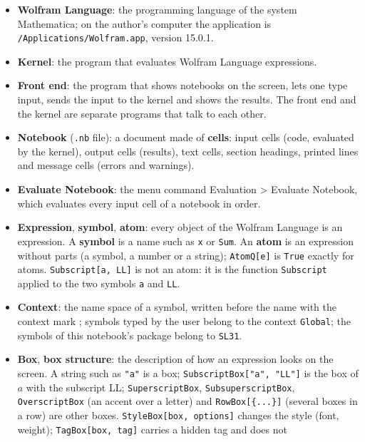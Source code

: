 \documentclass[
  10pt,
]{article}
\begin{document}
\begin{itemize}
\item
  \textbf{Wolfram Language}: the programming language of the system
  Mathematica; on the author's computer the application is
  \texttt{/Applications/Wolfram.app}, version 15.0.1.
\item
  \textbf{Kernel}: the program that evaluates Wolfram Language
  expressions.
\item
  \textbf{Front end}: the program that shows notebooks on the screen,
  lets one type input, sends the input to the kernel and shows the
  results. The front end and the kernel are separate programs that talk
  to each other.
\item
  \textbf{Notebook} (\texttt{.nb} file): a document made of
  \textbf{cells}: input cells (code, evaluated by the kernel), output
  cells (results), text cells, section headings, printed lines and
  message cells (errors and warnings).
\item
  \textbf{Evaluate Notebook}: the menu command Evaluation \textgreater{}
  Evaluate Notebook, which evaluates every input cell of a notebook in
  order.
\item
  \textbf{Expression}, \textbf{symbol}, \textbf{atom}: every object of
  the Wolfram Language is an expression. A \textbf{symbol} is a name
  such as \texttt{x} or \texttt{Sum}. An \textbf{atom} is an expression
  without parts (a symbol, a number or a string); \texttt{AtomQ{[}e{]}}
  is \texttt{True} exactly for atoms. \texttt{Subscript{[}a,\ LL{]}} is
  not an atom: it is the function \texttt{Subscript} applied to the two
  symbols \texttt{a} and \texttt{LL}.
\item
  \textbf{Context}: the name space of a symbol, written before the name
  with the context mark \texttt{\textasciigrave{}}; symbols typed by the
  user belong to the context \texttt{Global\textasciigrave{}}; the
  symbols of this notebook's package belong to
  \texttt{SL31\textasciigrave{}}.
\item
  \textbf{Box}, \textbf{box structure}: the description of how an
  expression looks on the screen. A string such as \texttt{"a"} is a
  box; \texttt{SubscriptBox{[}"a",\ "LL"{]}} is the box of \(a\) with
  the subscript LL; \texttt{SuperscriptBox}, \texttt{SubsuperscriptBox},
  \texttt{OverscriptBox} (an accent over a letter) and
  \texttt{RowBox{[}\{...\}{]}} (several boxes in a row) are other boxes.
  \texttt{StyleBox{[}box,\ options{]}} changes the style (font, weight);
  \texttt{TagBox{[}box,\ tag{]}} carries a hidden tag and does not

\end{itemize}
\end{document}
